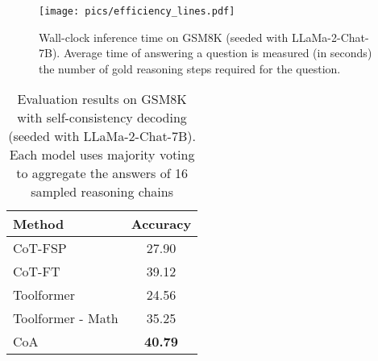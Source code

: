 \begin{figure}[t]
\centering
\texttt{[image: pics/efficiency\_lines.pdf]}
\caption{Wall-clock inference time on GSM8K (seeded with LLaMa-2-Chat-7B). Average time of answering a question is measured (in seconds) \wrt{} the number of gold reasoning steps required for the question.}
\label{efficiency_lines}
\end{figure}

\begin{table}[t]
\centering
\begin{tabular}{lc}
\toprule
\textbf{Method}  &  \textbf{Accuracy}   \\
\toprule
CoT-FSP       & 27.90 \\
CoT-FT        & 39.12 \\
Toolformer    & 24.56 \\
Toolformer - Math & 35.25 \\
CoA & \textbf{40.79} \\
\bottomrule
\end{tabular}
\caption{
Evaluation results on GSM8K with self-consistency decoding (seeded with LLaMa-2-Chat-7B). Each model uses majority voting to aggregate the answers of 16 sampled reasoning chains
}
\label{tab:self_consistency}
\end{table}

